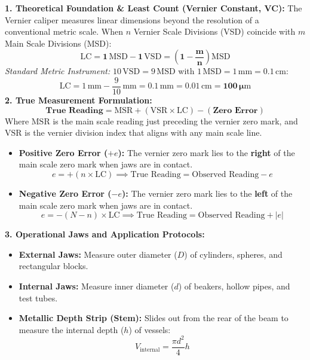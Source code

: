 \documentclass[10pt,twoside,openright]{book}
\begin{document}
\begin{formulabox}
\textbf{1. Theoretical Foundation \& Least Count (Vernier Constant, VC):}
The Vernier caliper measures linear dimensions beyond the resolution of a conventional metric scale. When $n$ Vernier Scale Divisions (VSD) coincide with $m$ Main Scale Divisions (MSD):
\begin{equation}
  \mathbf{\mathrm{LC} = 1\,\mathrm{MSD} - 1\,\mathrm{VSD} = \left(1 - \frac{m}{n}\right)\mathrm{MSD}}
\end{equation}
\textit{Standard Metric Instrument:} $10\,\mathrm{VSD} = 9\,\mathrm{MSD}$ with $1\,\mathrm{MSD} = 1\,\mathrm{mm} = 0.1\,\mathrm{cm}$:
\begin{equation}
  \mathrm{LC} = 1\,\mathrm{mm} - \frac{9}{10}\,\mathrm{mm} = \mathbf{0.1\,\mathrm{mm} = 0.01\,\mathrm{cm} = 100\,\mu\mathrm{m}}
\end{equation}
\textbf{2. True Measurement Formulation:}
\begin{equation}
  \mathbf{\text{True Reading} = \mathrm{MSR} + (\mathrm{VSR} \times \mathrm{LC}) - (\text{Zero Error})}
\end{equation}
Where $\mathrm{MSR}$ is the main scale reading just preceding the vernier zero mark, and $\mathrm{VSR}$ is the vernier division index that aligns with any main scale line.
\begin{itemize}
  \item \textbf{Positive Zero Error ($+e$):} The vernier zero mark lies to the \textbf{right} of the main scale zero mark when jaws are in contact.
  \begin{equation}
    e = +(n \times \mathrm{LC}) \implies \text{True Reading} = \text{Observed Reading} - e
  \end{equation}
  \item \textbf{Negative Zero Error ($-e$):} The vernier zero mark lies to the \textbf{left} of the main scale zero mark when jaws are in contact.
  \begin{equation}
    e = -(N - n)\times \mathrm{LC} \implies \text{True Reading} = \text{Observed Reading} + |e|
  \end{equation}
\end{itemize}
\textbf{3. Operational Jaws and Application Protocols:}
\begin{itemize}
  \item \textbf{External Jaws:} Measure outer diameter ($D$) of cylinders, spheres, and rectangular blocks.
  \item \textbf{Internal Jaws:} Measure inner diameter ($d$) of beakers, hollow pipes, and test tubes.
  \item \textbf{Metallic Depth Strip (Stem):} Slides out from the rear of the beam to measure the internal depth ($h$) of vessels:
  \begin{equation}
    V_{\text{internal}} = \frac{\pi d^2}{4} h
  \end{equation}
\end{itemize}
\end{formulabox}
\end{document}
